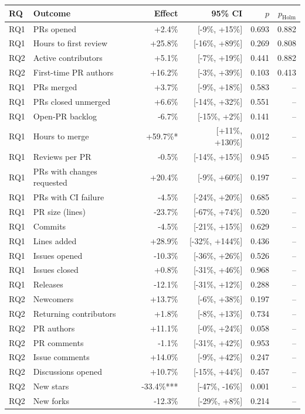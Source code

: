 \begin{tabular}{llrrrr}
\toprule
RQ & Outcome & Effect & 95\% CI & $p$ & $p_{\text{Holm}}$ \\
\midrule
RQ1 & PRs opened & +2.4\% & [-9\%, +15\%] & 0.693 & 0.882 \\
RQ1 & Hours to first review & +25.8\% & [-16\%, +89\%] & 0.269 & 0.808 \\
RQ2 & Active contributors & +5.1\% & [-7\%, +19\%] & 0.441 & 0.882 \\
RQ2 & First-time PR authors & +16.2\% & [-3\%, +39\%] & 0.103 & 0.413 \\
\midrule
RQ1 & PRs merged & +3.7\% & [-9\%, +18\%] & 0.583 & -- \\
RQ1 & PRs closed unmerged & +6.6\% & [-14\%, +32\%] & 0.551 & -- \\
RQ1 & Open-PR backlog & -6.7\% & [-15\%, +2\%] & 0.141 & -- \\
RQ1 & Hours to merge & +59.7\%* & [+11\%, +130\%] & 0.012 & -- \\
RQ1 & Reviews per PR & -0.5\% & [-14\%, +15\%] & 0.945 & -- \\
RQ1 & PRs with changes requested & +20.4\% & [-9\%, +60\%] & 0.197 & -- \\
RQ1 & PRs with CI failure & -4.5\% & [-24\%, +20\%] & 0.685 & -- \\
RQ1 & PR size (lines) & -23.7\% & [-67\%, +74\%] & 0.520 & -- \\
RQ1 & Commits & -4.5\% & [-21\%, +15\%] & 0.629 & -- \\
RQ1 & Lines added & +28.9\% & [-32\%, +144\%] & 0.436 & -- \\
RQ1 & Issues opened & -10.3\% & [-36\%, +26\%] & 0.526 & -- \\
RQ1 & Issues closed & +0.8\% & [-31\%, +46\%] & 0.968 & -- \\
RQ1 & Releases & -12.1\% & [-31\%, +12\%] & 0.288 & -- \\
RQ2 & Newcomers & +13.7\% & [-6\%, +38\%] & 0.197 & -- \\
RQ2 & Returning contributors & +1.8\% & [-8\%, +13\%] & 0.734 & -- \\
RQ2 & PR authors & +11.1\% & [-0\%, +24\%] & 0.058 & -- \\
RQ2 & PR comments & -1.1\% & [-31\%, +42\%] & 0.953 & -- \\
RQ2 & Issue comments & +14.0\% & [-9\%, +42\%] & 0.247 & -- \\
RQ2 & Discussions opened & +10.7\% & [-15\%, +44\%] & 0.457 & -- \\
RQ2 & New stars & -33.4\%*** & [-47\%, -16\%] & 0.001 & -- \\
RQ2 & New forks & -12.3\% & [-29\%, +8\%] & 0.214 & -- \\
\bottomrule
\end{tabular}
